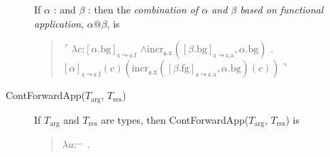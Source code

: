 \begin{description}
  If $\alpha$ :  
and $\beta$ : 
                         then the \textit{combination of $\alpha$ and
    $\beta$  based on functional application}, $\alpha\text{@}\beta$, is
  \begin{quote}
    $\ulcorner\lambda c$:$[\alpha.\text{bg}]_{\mathfrak{c}\leadsto\mathfrak{c}.\text{f}}$
      \d{$\wedge$}$\mathrm{incr}_{\mathfrak{s}.\text{x}}([\beta.\text{bg}]_{\mathfrak{c}\leadsto\mathfrak{c}.\text{a}},\alpha.\text{bg})$
      . \\ \hspace*{2em}$[\alpha]_{\mathfrak{c}\leadsto\mathfrak{c}.\text{f}}(c)(\mathrm{incr}_{\mathfrak{s}.\text{x}}([\beta.\text{fg}]_{\mathfrak{c}\leadsto\mathfrak{c}.\text{a}},\alpha.\text{bg})(c))\urcorner$
      
\end{quote}


\item[\textnormal{ContForwardApp($T_{\text{arg}}$, $T_{\text{res}}$)}] \mbox{}

  If $T_{\text{arg}}$ and $T_{\text{res}}$ are types, then
  ContForwardApp($T_{\text{arg}}$, $T_{\text{res}}$) is
\begin{quote}
  $\lambda
u$:$^{\frown}$
    . \\
\hspace*{2em}
\end{quote}



\end{description}

